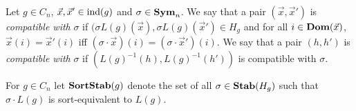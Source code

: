 \documentclass[../paper.tex]{subfiles}
\begin{document}


\begin{definition}
  Let $g \in C_n$, $\vec{x}, \vec{x}' \in \text{\upshape ind}(g)$ and $\sigma \in \text{\textbf{Sym}}_n$. We
  say that a pair $(\vec{x}, \vec{x}')$ is \emph{compatible with} $\sigma$ if
  $(\sigma L(g)(\vec{x}), \sigma L(g)(\vec{x}') \in H_g$ and for all $i \in \text{\textbf{Dom}}
  (\vec{x})$, $\vec{x}(i) = \vec{x}'(i)$ iff $(\sigma \cdot \vec{x})(i) =
  (\sigma \cdot \vec{x}')(i)$. We say that a pair $(h, h')$ is \emph{compatible
    with} $\sigma$ if $(L(g)^{-1}(h), L(g)^{-1}(h'))$ is compatible with
  $\sigma$.
\end{definition}

For $g \in C_n$ let $\text{\textbf{SortStab}} (g)$ denote the set of all $\sigma \in
\text{\textbf{Stab}}(H_g)$ such that $\sigma \cdot L(g)$ is sort-equivalent to $L(g)$.
\end{document}
